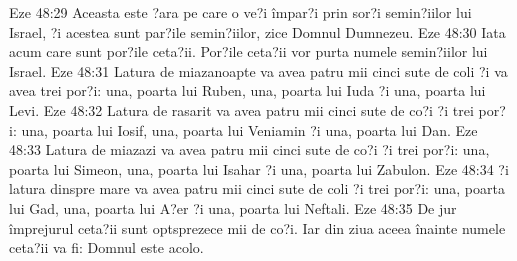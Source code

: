 Eze 48:29  Aceasta este ?ara pe care o ve?i împar?i prin sor?i semin?iilor lui Israel, ?i acestea sunt par?ile semin?iilor, zice Domnul Dumnezeu.
Eze 48:30  Iata acum care sunt por?ile ceta?ii. Por?ile ceta?ii vor purta numele semin?iilor lui Israel.
Eze 48:31  Latura de miazanoapte va avea patru mii cinci sute de coli ?i va avea trei por?i: una, poarta lui Ruben, una, poarta lui Iuda ?i una, poarta lui Levi.
Eze 48:32  Latura de rasarit va avea patru mii cinci sute de co?i ?i trei por?i: una, poarta lui Iosif, una, poarta lui Veniamin ?i una, poarta lui Dan.
Eze 48:33  Latura de miazazi va avea patru mii cinci sute de co?i ?i trei por?i: una, poarta lui Simeon, una, poarta lui Isahar ?i una, poarta lui Zabulon.
Eze 48:34  ?i latura dinspre mare va avea patru mii cinci sute de coli ?i trei por?i: una, poarta lui Gad, una, poarta lui A?er ?i una, poarta lui Neftali.
Eze 48:35  De jur împrejurul ceta?ii sunt optsprezece mii de co?i. Iar din ziua aceea înainte numele ceta?ii va fi: Domnul este acolo.


